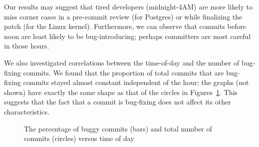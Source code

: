 Our results may suggest that tired developers (midnight-4AM) are more
likely to miss corner cases in a pre-commit review (for Postgres) or
while finalizing the patch (for the Linux kernel). Furthermore, we can observe
that commits before noon are least likely to be bug-introducing;
perhaps committers are most careful in those hours.

We also investigated correlations between the time-of-day and the
number of bug-fixing commits. We found that the proportion of total
commits that are bug-fixing commits stayed almost constant independent
of the hour; the graphs (not shown) have exactly the same shape as
that of the circles in Figures~\ref{fig-bugginess-hour}.
This suggests that the fact
that a commit is bug-fixing does not affect its other characteristics.

\begin{figure}[tbh]
\centering
{}
\caption{The percentage of buggy commits (bars) and total number of commits (circles) versus time of day}
\label{fig-bugginess-hour} %
\end{figure}


